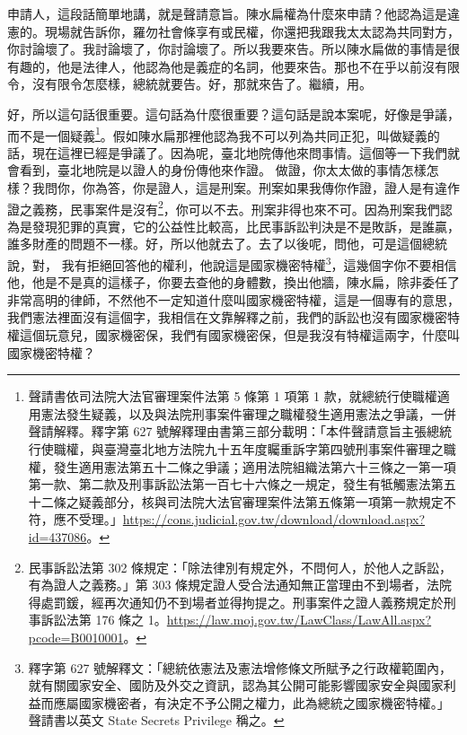 \hypertarget{c11:cue:28}{}申請人，這段話簡單地講，就是聲請意旨。陳水扁權為什麼來申請？他認為這是違憲的。現場就告訴你，羅勿社會條享有或民權，你還把我跟我太太認為共同對方，你討論壞了。我討論壞了，你討論壞了。所以我要來告。所以陳水扁做的事情是很有趣的，他是法律人，他認為他是義症的名詞，他要來告。那也不在乎以前沒有限令，沒有限令怎麼樣，總統就要告。好，那就來告了。繼續，用。

\hypertarget{c11:cue:29}{}好，所以這句話很重要。這句話為什麼很重要？這句話是說本案呢，好像是爭議，而不是一個疑義\footnote{聲請書依司法院大法官審理案件法第 5 條第 1 項第 1 款，就總統行使職權適用憲法發生疑義，以及與法院刑事案件審理之職權發生適用憲法之爭議，一併聲請解釋。釋字第 627 號解釋理由書第三部分載明：「本件聲請意旨主張總統行使職權，與臺灣臺北地方法院九十五年度矚重訴字第四號刑事案件審理之職權，發生適用憲法第五十二條之爭議；適用法院組織法第六十三條之一第一項第一款、第二款及刑事訴訟法第一百七十六條之一規定，發生有牴觸憲法第五十二條之疑義部分，核與司法院大法官審理案件法第五條第一項第一款規定不符，應不受理。」\url{https://cons.judicial.gov.tw/download/download.aspx?id=437086}。}。假如陳水扁那裡他認為我不可以列為共同正犯，叫做疑義的話，現在這裡已經是爭議了。因為呢，臺北地院傳他來問事情。這個等一下我們就會看到，臺北地院是以證人的身份傳他來作證。
\hypertarget{c11:cue:30}{}做證，你太太做的事情怎樣怎樣？我問你，你為答，你是證人，這是刑案。刑案如果我傳你作證，證人是有違作證之義務，民事案件是沒有\footnote{民事訴訟法第 302 條規定：「除法律別有規定外，不問何人，於他人之訴訟，有為證人之義務。」第 303 條規定證人受合法通知無正當理由不到場者，法院得處罰鍰，經再次通知仍不到場者並得拘提之。刑事案件之證人義務規定於刑事訴訟法第 176 條之 1。\url{https://law.moj.gov.tw/LawClass/LawAll.aspx?pcode=B0010001}。}，你可以不去。刑案非得也來不可。因為刑案我們認為是發現犯罪的真實，它的公益性比較高，比民事訴訟判決是不是敗訴，是誰贏，誰多財產的問題不一樣。好，所以他就去了。去了以後呢，問他，可是這個總統說，對，
\hypertarget{c11:cue:31}{}我有拒絕回答他的權利，他說這是國家機密特權\footnote{釋字第 627 號解釋文：「總統依憲法及憲法增修條文所賦予之行政權範圍內，就有關國家安全、國防及外交之資訊，認為其公開可能影響國家安全與國家利益而應屬國家機密者，有決定不予公開之權力，此為總統之國家機密特權。」聲請書以英文 State Secrets Privilege 稱之。}，這幾個字你不要相信他，他是不是真的這樣子，你要去查他的身體數，換出他牆，陳水扁，除非委任了非常高明的律師，不然他不一定知道什麼叫國家機密特權，這是一個專有的意思，我們憲法裡面沒有這個字，我相信在文靠解釋之前，我們的訴訟也沒有國家機密特權這個玩意兒，國家機密保，我們有國家機密保，但是我沒有特權這兩字，什麼叫國家機密特權？

